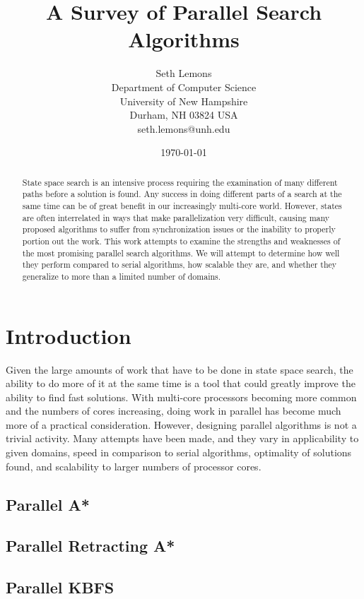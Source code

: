 \documentclass{article}
\title{A Survey of Parallel Search Algorithms}
\author{Seth Lemons \\
Department of Computer Science \\
University of New Hampshire \\
Durham, NH 03824 USA \\
seth.lemons@unh.edu}
\date{\today}
\begin{document}
\maketitle

\begin{abstract}
State space search is an intensive process requiring the examination of many different paths before a solution is found. Any success in doing different parts of a search at the same time can be of great benefit in our increasingly multi-core world. However, states are often interrelated in ways that make parallelization very difficult, causing many proposed algorithms to suffer from synchronization issues or the inability to properly portion out the work. This work attempts to examine the strengths and weaknesses of the most promising parallel search algorithms. We will attempt to determine how well they perform compared to serial algorithms, how scalable they are, and whether they generalize to more than a limited number of domains.
\end{abstract}

\section{Introduction}
Given the large amounts of work that have to be done in state space search, the ability to do more of it at the same time is a tool that could greatly improve the ability to find fast solutions. With multi-core processors becoming more common and the numbers of cores increasing, doing work in parallel has become much more of a practical consideration. However, designing parallel algorithms is not a trivial activity. Many attempts have been made, and they vary in applicability to given domains, speed in comparison to serial algorithms, optimality of solutions found, and scalability to larger numbers of processor cores.
\subsection{Parallel A*}
\cite{hart:fbh}
\subsection{Parallel Retracting A*}
\cite{evett:pra}
\subsection{Parallel KBFS}
\cite{felner:kbf}
\end{document}
